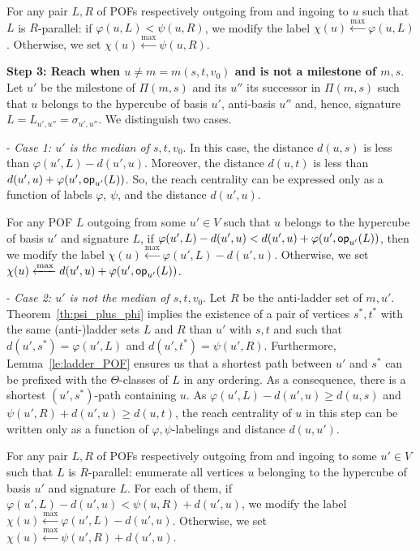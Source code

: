 \documentclass[a4paper,UKenglish,numberwithinsect,cleveref, autoref,anonymous]{lipics-v2021}
\newcommand{\opp}{\mbox{\textsf{op}}}
\begin{document}
For any pair $L,R$ of POFs respectively outgoing from and ingoing to $u$ such that $L$ is $R$-parallel: if $\varphi(u,L) < \psi(u,R)$, we modify the label $\chi(u) \xleftarrow{\max} \varphi(u,L)$. Otherwise, we set $\chi(u) \xleftarrow{\max} \psi(u,R)$.

\textbf{Step 3: Reach when $u\neq m=m(s,t,v_0)$ and is not a milestone of $m,s$}. Let $u'$ be the milestone of $\Pi(m,s)$ and its $u''$ its successor in $\Pi(m,s)$ such that $u$ belongs to the hypercube of basis $u'$, anti-basis $u''$ and, hence, signature $L = L_{u',u''} = \sigma_{u',u''}$. We distinguish two cases.

- \textit{Case 1: $u'$ is the median of $s,t,v_0$}. In this case, the distance $d(u,s)$ is less than $\varphi(u',L)-d(u',u)$. Moreover, the distance $d(u,t)$ is less than $d(u',u)+\varphi(u',\opp_{u'}(L))$. So, the  reach centrality can be expressed only as a function of labels $\varphi$, $\psi$, and the distance $d(u',u)$.

For any POF $L$ outgoing from some $u' \in V$ such that $u$ belongs to the hypercube of basis $u'$ and signature $L$, if $\varphi(u',L)-d(u',u) < d(u',u)+\varphi(u',\opp_{u'}(L))$, then we modify the label $\chi(u) \xleftarrow{\max} \varphi(u',L)-d(u',u)$. Otherwise, we set $\chi(u) \xleftarrow{\max} d(u',u)+\varphi(u',\opp_{u'}(L))$.

- \textit{Case 2: $u'$ is not the median of $s,t,v_0$}. Let $R$ be the anti-ladder set of $m,u'$. Theorem~\ref{th:psi_plus_phi} implies the existence of a pair of vertices $s^*,t^*$ with the same (anti-)ladder sets $L$ and $R$ than $u'$ with $s,t$ and such that $d(u',s^*) = \varphi(u',L)$ and $d(u',t^*) = \psi(u',R)$. Furthermore, Lemma~\ref{le:ladder_POF} ensures us that a shortest path between $u'$ and $s^*$ can be prefixed with the $\Theta$-classes of $L$ in any ordering. As a consequence, there is a shortest $(u',s^*)$-path containing $u$. As $\varphi(u',L)-d(u',u) \ge d(u,s)$ and $\psi(u',R) + d(u',u) \ge d(u,t)$, the  reach centrality of $u$ in this step can be written only as a function of  $\varphi,\psi$-labelings and distance $d(u,u')$.

For any pair $L,R$ of POFs respectively outgoing from and ingoing to some $u' \in V$ such that $L$ is $R$-parallel: enumerate all vertices $u$ belonging to the hypercube of basis $u'$ and signature $L$. For each of them, if $\varphi(u',L)-d(u',u) < \psi(u,R)+d(u',u)$, we modify the label $\chi(u) \xleftarrow{\max} \varphi(u',L)-d(u',u)$. Otherwise, we set $\chi(u) \xleftarrow{\max} \psi(u',R)+d(u',u)$.
\end{document}

